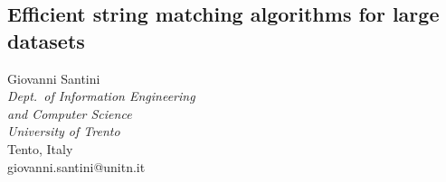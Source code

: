 \documentclass[12pt]{article}
\begin{document}
\fontsize{9}{10}\selectfont  %

\begin{center}
\section*{\huge{\sffamily Efficient string matching algorithms for large datasets}}
Giovanni Santini \\
\textit{Dept.\ of Information Engineering \\
and Computer Science} \\
\textit{University of Trento} \\
Tento, Italy \\
giovanni.santini@unitn.it
\end{center}

\bigskip
\end{document}

